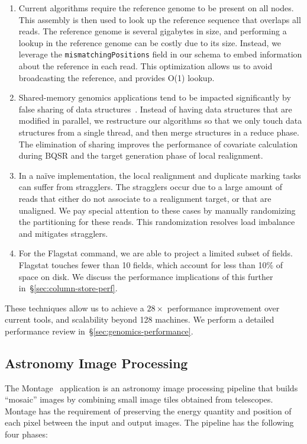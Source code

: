 \documentclass{acm_proc_article-sp}
\begin{document}
\begin{enumerate}
\item Current algorithms require the reference genome to be present on all nodes. This assembly is then used to
look up the reference sequence that overlaps all reads. The reference genome is several gigabytes in
size, and performing a lookup in the reference genome can be costly due to its size. Instead, we leverage
the \texttt{mismatchingPositions} field in our schema to embed information about the reference in each read. This
optimization allows us to avoid broadcasting the reference, and provides O(1) lookup.
\item Shared-memory genomics applications tend to be impacted significantly by false sharing of data
\linebreak structures~\cite{zaharia11}. Instead of having data structures that are modified in parallel, we
restructure our algorithms so that we only touch data structures from a single thread, and then merge
structures in a reduce phase. The elimination of sharing improves the performance of covariate calculation during
BQSR and the target generation phase of local realignment.
\item In a na\"{i}ve implementation, the local realignment and duplicate marking tasks can suffer from
stragglers. The stragglers occur due to a large amount of reads that either do not associate to a realignment
target, or that are unaligned. We pay special attention to these cases by manually randomizing the
partitioning for these reads. This randomization resolves load imbalance and mitigates stragglers.
\item For the Flagstat command, we are able to project a limited subset of fields. Flagstat touches fewer
than 10 fields, which account for less than 10\% of space on disk. We discuss the performance
implications of this further in~\S\ref{sec:column-store-perf}.
\end{enumerate}

These techniques allow us to achieve a $28\times$ performance improvement over current
tools, and scalability beyond 128 machines. We perform a detailed performance review
in~\S\ref{sec:genomics-performance}.

\subsection{Astronomy Image Processing}
\label{sec:astronomy-image-processing}

The Montage~\cite{montage} application is an astronomy image processing pipeline that builds ``mosaic'' images
by combining small image tiles obtained from telescopes. Montage has the requirement of preserving the energy
quantity and position of each pixel between the input and output images. The pipeline has the following four
phases:
\end{document}
